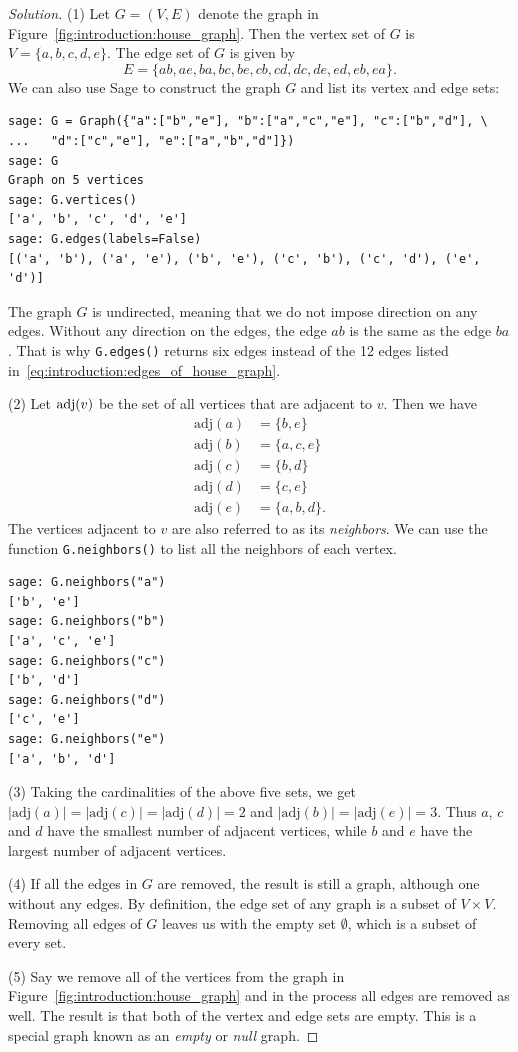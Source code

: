 \begin{proof}[Solution]
(1) Let $G = (V, E)$ denote the graph in
Figure~\ref{fig:introduction:house_graph}. Then the vertex set of $G$
is $V = \{ a, b, c, d, e \}$. The edge set of $G$ is given by
\begin{equation}
\label{eq:introduction:edges_of_house_graph}
E
=
\{ ab, ae, ba, bc, be, cb, cd, dc, de, ed, eb, ea \}.
\end{equation}
We can also use Sage to construct the graph $G$ and list its vertex
and edge sets:
%
\begin{lstlisting}
sage: G = Graph({"a":["b","e"], "b":["a","c","e"], "c":["b","d"], \
...   "d":["c","e"], "e":["a","b","d"]})
sage: G
Graph on 5 vertices
sage: G.vertices()
['a', 'b', 'c', 'd', 'e']
sage: G.edges(labels=False)
[('a', 'b'), ('a', 'e'), ('b', 'e'), ('c', 'b'), ('c', 'd'), ('e', 'd')]
\end{lstlisting}
%
The graph $G$ is undirected, meaning that we do not impose direction
on any edges. Without any direction on the edges, the edge $ab$ is the
same as the edge $ba$. That is why \texttt{G.edges()} returns six
edges instead of the 12 edges listed
in~\eqref{eq:introduction:edges_of_house_graph}.

\index{$\adj$}
(2) Let $\operatorname*{adj}(v)$ be the set of all vertices that are adjacent
to $v$. Then we have
%
\begin{align*}
\text{adj}(a) &= \{ b, e \} \\
\text{adj}(b) &= \{ a, c, e \} \\
\text{adj}(c) &= \{ b, d \} \\
\text{adj}(d) &= \{ c, e \} \\
\text{adj}(e) &= \{ a, b, d \}.
\end{align*}
%
The vertices adjacent to $v$ are also referred to as its
\emph{neighbors}. We can use the function \texttt{G.neighbors()} to
list all the neighbors of each vertex.
%
\begin{lstlisting}
sage: G.neighbors("a")
['b', 'e']
sage: G.neighbors("b")
['a', 'c', 'e']
sage: G.neighbors("c")
['b', 'd']
sage: G.neighbors("d")
['c', 'e']
sage: G.neighbors("e")
['a', 'b', 'd']
\end{lstlisting}

(3) Taking the cardinalities of the above five sets, we get
$|\text{adj}(a)| = |\text{adj}(c)| = |\text{adj}(d)| = 2$ and
$|\text{adj}(b)| = |\text{adj}(e)| = 3$. Thus $a$, $c$ and $d$ have
the smallest number of adjacent vertices, while $b$ and $e$ have the
largest number of adjacent vertices.

(4) If all the edges in $G$ are removed, the result is still a graph,
although one without any edges. By definition, the edge set of any
graph is a subset of $V \times V$. Removing all edges of $G$ leaves us
with the empty set $\emptyset$, which is a subset of every set.

(5) Say we remove all of the vertices from the graph in
Figure~\ref{fig:introduction:house_graph} and in the process all edges
are removed as well. The result is that both of the vertex and edge
sets are empty. This is a special graph known as an \emph{empty} or
\emph{null} graph.
\end{proof}

